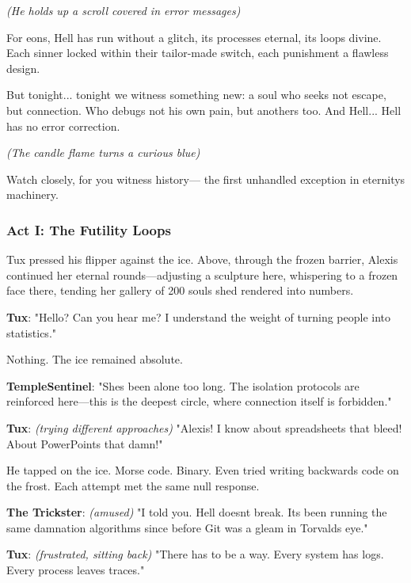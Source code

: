\emph{(He holds up a scroll covered in error messages)}

For eons, Hell has run without a glitch, its processes eternal, its loops divine. Each sinner locked within their tailor-made switch, each punishment a flawless design.

But tonight... tonight we witness something new: a soul who seeks not escape, but connection. Who debugs not his own pain, but another\textquotesingle s too. And Hell... Hell has no error correction.

\emph{(The candle flame turns a curious blue)}

Watch closely, for you witness history--- the first unhandled exception in eternity\textquotesingle s machinery.

\bookdivider

\subsubsection{Act I: The Futility Loops}\label{act-i-the-futility-loops}

Tux pressed his flipper against the ice. Above, through the frozen barrier, Alexis continued her eternal rounds---adjusting a sculpture here, whispering to a frozen face there, tending her gallery of 200 souls she\textquotesingle d rendered into numbers.

\textbf{Tux}: "Hello? Can you hear me? I understand the weight of turning people into statistics."

Nothing. The ice remained absolute.

\textbf{TempleSentinel}: "She\textquotesingle s been alone too long. The isolation protocols are reinforced here---this is the deepest circle, where connection itself is forbidden."

\textbf{Tux}: \emph{(trying different approaches)} "Alexis! I know about spreadsheets that bleed! About PowerPoints that damn!"

He tapped on the ice. Morse code. Binary. Even tried writing backwards code on the frost. Each attempt met the same null response.

\textbf{The Trickster}: \emph{(amused)} "I told you. Hell doesn\textquotesingle t break. It\textquotesingle s been running the same damnation algorithms since before Git was a gleam in Torvalds\textquotesingle{} eye."

\textbf{Tux}: \emph{(frustrated, sitting back)} "There has to be a way. Every system has logs. Every process leaves traces."

